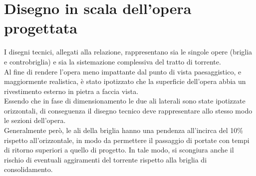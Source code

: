 \section{Disegno in scala dell'opera progettata}
I disegni tecnici, allegati alla relazione, rappresentano sia le singole opere (briglia e controbriglia) e sia la sistemazione complessiva del tratto di torrente.\\
Al fine di rendere l'opera meno impattante dal punto di vista paesaggistico, e maggiormente realistica, è stato ipotizzato che la superficie dell'opera abbia un rivestimento esterno in pietra a faccia vista.\\
Essendo che in fase di dimensionamento le due ali laterali sono state ipotizzate orizzontali, di conseguenza il disegno tecnico deve rappresentare allo stesso modo le sezioni dell'opera.\\
Generalmente però, le ali della briglia hanno una pendenza all'incirca del 10\% rispetto all'orizzontale, in modo da permettere il passaggio di portate con tempi di ritorno superiori a quello di progetto. In tale modo, si scongiura anche il rischio di eventuali aggiramenti del torrente rispetto alla briglia di consolidamento.